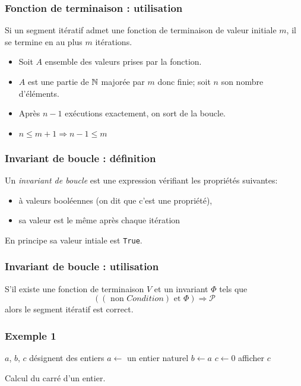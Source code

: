 \begin{frame}
  \frametitle{Fonction de terminaison : utilisation}
\begin{prop}
  Si un segment itératif admet une fonction de terminaison de valeur initiale $m$, il se termine en au plus $m$ itérations.
\end{prop}
\begin{itemize}
  \item Soit $A$ ensemble des valeurs prises par la fonction.
  \item $A$ est une partie de $\mathbb{N}$ majorée par $m$ donc finie; soit $n$ son nombre d'éléments.
  \item Après $n-1$ exécutions exactement, on sort de la boucle.
  \item $n\leq m+1 \Rightarrow n-1 \leq m$
\end{itemize}
\end{frame}

\begin{frame}
  \frametitle{Invariant de boucle : définition}
\begin{defi}
  Un \emph{invariant de boucle} est une expression vérifiant les propriétés suivantes:
\begin{itemize}
  \item à valeurs booléennes (on dit que c'est une propriété),
  \item sa valeur est le même après chaque itération
\end{itemize}
\end{defi}
En principe sa valeur intiale est \texttt{True}.
\end{frame}

\begin{frame}
  \frametitle{Invariant de boucle : utilisation}
\begin{prop}
S'il existe une fonction de terminaison $V$ et un invariant $\Phi$ tels que
\begin{displaymath}
  \left( \left( \text{ non } Condition\right) \text{ et } \Phi \right) \Rightarrow \mathcal{P}
\end{displaymath}
alors le segment itératif est correct.
\end{prop}
\end{frame}

\begin{frame}
  \frametitle{Exemple 1}
\begin{algorithm}[H]
  $a$, $b$, $c$ désignent des entiers\;
  $a\longleftarrow$ un entier naturel\;
  $b\longleftarrow a$\;
  $c\longleftarrow 0$\;
  afficher $c$\;
  \caption{Calcul du carré d'un entier.}
  \label{corsegit_2}
\end{algorithm}
\end{frame}

